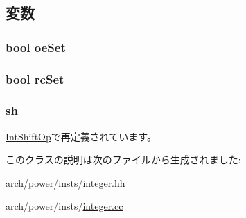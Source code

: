 \subsection{変数}
\hypertarget{classPowerISA_1_1IntOp_af9dda19aeb854a1287c78dcd042af18a}{
\subsubsection[{oeSet}]{\setlength{\rightskip}{0pt plus 5cm}bool {\bf oeSet}}}
\label{classPowerISA_1_1IntOp_af9dda19aeb854a1287c78dcd042af18a}
\hypertarget{classPowerISA_1_1IntOp_abfffe0b446d6f9419bdf9e72c73741fc}{
\subsubsection[{rcSet}]{\setlength{\rightskip}{0pt plus 5cm}bool {\bf rcSet}}}
\label{classPowerISA_1_1IntOp_abfffe0b446d6f9419bdf9e72c73741fc}
\hypertarget{classPowerISA_1_1IntOp_a2b6cd065d4330a52705b9237b1062c6a}{
\subsubsection[{sh}]{ {\bf sh}}}
\label{classPowerISA_1_1IntOp_a2b6cd065d4330a52705b9237b1062c6a}


\hyperlink{classPowerISA_1_1IntShiftOp_a2b6cd065d4330a52705b9237b1062c6a}{IntShiftOp}で再定義されています。

このクラスの説明は次のファイルから生成されました:\begin{DoxyCompactItemize}
\item 
arch/power/insts/\hyperlink{integer_8hh}{integer.hh}\item 
arch/power/insts/\hyperlink{integer_8cc}{integer.cc}\end{DoxyCompactItemize}

